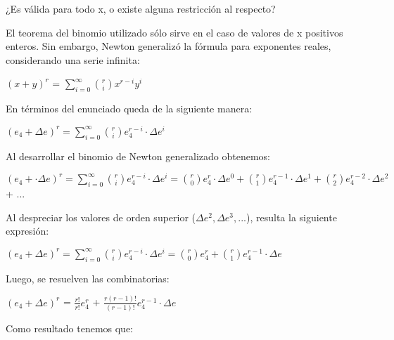 \documentclass[]{article}
\begin{document}
	
\begin{flushleft}
	¿Es válida para todo x, o existe alguna restricción al respecto? \\
\end{flushleft}

\begin{flushleft}
	El teorema del binomio utilizado sólo sirve en el caso de valores de x positivos enteros. Sin embargo, Newton generalizó la fórmula para exponentes reales, considerando una serie infinita:
\end{flushleft}

\begin{center}
	$(x + y)^{r}$ = $\displaystyle\sum_{i=0}^{\infty} {r \choose i} x^{r-i}y^{i}$
\end{center}
En términos del enunciado queda de la siguiente manera:

\begin{center}
	$(e_{4} + \Delta{e})^{r} = \displaystyle\sum_{i=0}^{\infty} {r \choose i} e_{4}^{r-i}\cdot\Delta{e}^{i}$
\end{center}
Al desarrollar el binomio de Newton generalizado obtenemos:

\begin{center}
	$(e_{4} + \cdot\Delta{e})^{r} = \displaystyle\sum_{i=0}^{\infty} {r \choose i} e_{4}^{r-i}\cdot\Delta{e}^{i} = \displaystyle{r \choose 0}e_{4}^{r}\cdot\Delta{e}^{0} +  \displaystyle{r \choose 1}e_{4}^{r-1}\cdot\Delta{e}^{1} +  \displaystyle{r \choose 2}e_{4}^{r-2}\cdot\Delta{e}^{2}$ + ...
\end{center}
Al despreciar los valores de orden superior ($\Delta e^{2}, \Delta e^{3}, ...$), resulta la siguiente expresión:

\begin{center}
	$(e_{4} + \Delta{e})^{r} = \displaystyle\sum_{i=0}^{\infty} {r \choose i} e_{4}^{r-i}\cdot\Delta{e}^{i} = \displaystyle{r \choose 0}e_{4}^{r} +  \displaystyle{r \choose 1}e_{4}^{r-1}\cdot\Delta{e}$
\end{center}

\begin{flushleft}
	Luego, se resuelven las combinatorias:
	
\end{flushleft}
\begin{center}
	$(e_{4} + \Delta{e})^{r}$ = $\displaystyle\frac{r!}{r!}e_{4}^{r}$ +  $\displaystyle\frac{r(r-1)!}{(r-1)!}e_{4}^{r-1}\cdot\Delta{e}$
\end{center}

\begin{flushleft}
	Como resultado tenemos que: 
\end{flushleft}
\end{document}
